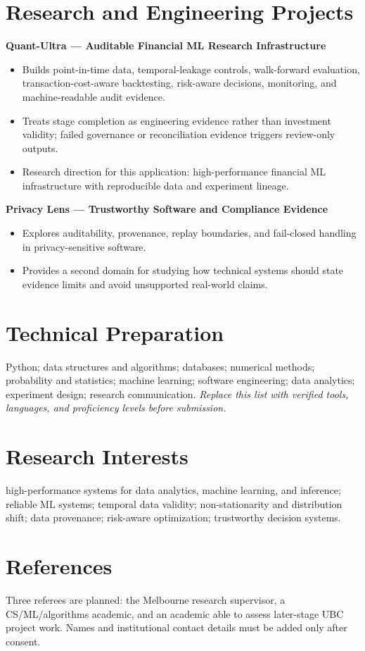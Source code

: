 \documentclass[11pt]{article}
\begin{document}
\section*{Research and Engineering Projects}
\textbf{Quant-Ultra --- Auditable Financial ML Research Infrastructure}
\begin{itemize}
\item Builds point-in-time data, temporal-leakage controls, walk-forward evaluation, transaction-cost-aware backtesting, risk-aware decisions, monitoring, and machine-readable audit evidence.
\item Treats stage completion as engineering evidence rather than investment validity; failed governance or reconciliation evidence triggers review-only outputs.
\item Research direction for this application: high-performance financial ML infrastructure with reproducible data and experiment lineage.
\end{itemize}

\begin{samepage}
\textbf{Privacy Lens --- Trustworthy Software and Compliance Evidence}
\begin{itemize}
\item Explores auditability, provenance, replay boundaries, and fail-closed handling in privacy-sensitive software.
\item Provides a second domain for studying how technical systems should state evidence limits and avoid unsupported real-world claims.
\end{itemize}
\end{samepage}

\section*{Technical Preparation}
Python; data structures and algorithms; databases; numerical methods; probability and statistics; machine learning; software engineering; data analytics; experiment design; research communication. \textit{Replace this list with verified tools, languages, and proficiency levels before submission.}

\section*{Research Interests}
high-performance systems for data analytics, machine learning, and inference; reliable ML systems; temporal data validity; non-stationarity and distribution shift; data provenance; risk-aware optimization; trustworthy decision systems.

\section*{References}
Three referees are planned: the Melbourne research supervisor, a CS/ML/algorithms academic, and an academic able to assess later-stage UBC project work. Names and institutional contact details must be added only after consent.
\end{document}
